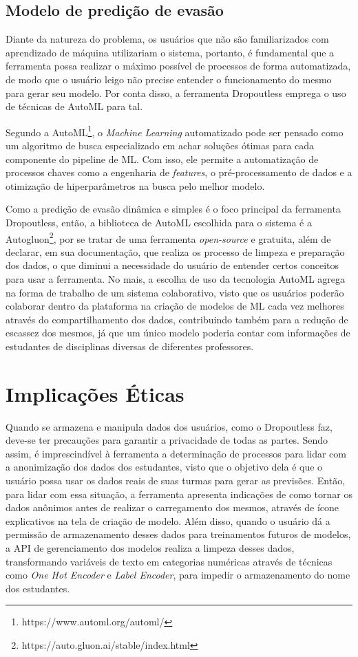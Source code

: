 \documentclass[12pt]{article}
\begin{document}
\subsection{Modelo de predição de evasão}
\label{sec:Modelo de predição de evasão}

Diante da natureza do problema, os usuários que não são familiarizados com aprendizado de máquina utilizariam o sistema, portanto, é fundamental que a ferramenta possa realizar o máximo possível de processos de forma automatizada, de modo que o usuário leigo não precise entender o funcionamento do mesmo para gerar seu modelo. Por conta disso, a ferramenta Dropoutless emprega o uso de técnicas de AutoML para tal. 

Segundo a AutoML\footnote{https://www.automl.org/automl/}, o \textit{Machine Learning} automatizado pode ser pensado como um algoritmo de busca especializado em achar soluções ótimas para cada componente do pipeline de ML. Com isso, ele permite a automatização de processos chaves como a engenharia de \textit{features}, o pré-processamento de dados e a otimização de hiperparâmetros na busca pelo melhor modelo.

Como a predição de evasão dinâmica e simples é o foco principal da ferramenta Dropoutless, então, a biblioteca de AutoML escolhida para o sistema é a Autogluon\footnote{https://auto.gluon.ai/stable/index.html}, por se tratar de uma ferramenta \textit{open-source} e gratuita, além de declarar, em sua documentação, que realiza os processo de limpeza e preparação dos dados, o que diminui a necessidade do usuário de entender certos conceitos para usar a ferramenta. No mais, a escolha de uso da tecnologia AutoML agrega na forma de trabalho de um sistema colaborativo, visto que os usuários poderão colaborar dentro da plataforma na criação de modelos de ML cada vez melhores através do compartilhamento dos dados, contribuindo também para a redução de escassez dos mesmos, já que um único modelo poderia contar com informações de estudantes de disciplinas diversas de diferentes professores.

\section{Implicações Éticas}
\label{sec:implicaoes éticas}

Quando se armazena e manipula dados dos usuários, como o Dropoutless faz, deve-se ter precauções para garantir a privacidade de todas as partes. Sendo assim, é imprescindível à ferramenta a determinação de processos para lidar com a anonimização dos dados dos estudantes, visto que o objetivo dela é que o usuário possa usar os dados reais de suas turmas para gerar as previsões. Então, para lidar com essa situação, a ferramenta apresenta indicações de como tornar os dados anônimos antes de realizar o carregamento dos mesmos, através de ícone explicativos na tela de criação de modelo. Além disso, quando o usuário dá a permissão de armazenamento desses dados para treinamentos futuros de modelos, a API de gerenciamento dos modelos realiza a limpeza desses dados, transformando variáveis de texto em categorias numéricas através de técnicas como \textit{One Hot Encoder} e \textit{Label Encoder}, para impedir o armazenamento do nome dos estudantes.
\end{document}
